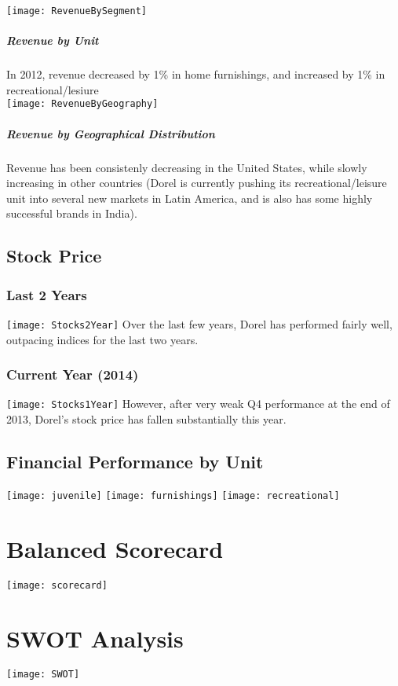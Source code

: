 \texttt{[image: RevenueBySegment]}
\paragraph{Revenue by Unit}In 2012, revenue decreased by 1\% in home furnishings, and increased by 1\% in recreational/lesiure
\\[1\baselineskip]

\texttt{[image: RevenueByGeography]}
\paragraph{Revenue by Geographical Distribution}Revenue has been consistenly decreasing in the United States, while slowly increasing in other countries (Dorel is currently pushing its recreational/leisure unit into several new markets in Latin America, and is also has some highly successful brands in India).

\section {Stock Price}
\subsection{Last 2 Years}
\texttt{[image: Stocks2Year]}
Over the last few years, Dorel has performed fairly well, outpacing indices for the last two years. 

\subsection{Current Year (2014)}
\texttt{[image: Stocks1Year]}
However, after very weak Q4 performance at the end of 2013, Dorel's stock price has fallen substantially this year.
\section {Financial Performance by Unit}
\texttt{[image: juvenile]}
\texttt{[image: furnishings]}
\texttt{[image: recreational]}

\chapter{Balanced Scorecard}
\label{chp:scorecard}
\texttt{[image: scorecard]}
\chapter{SWOT Analysis}
\label{chp:swot}
\texttt{[image: SWOT]}

